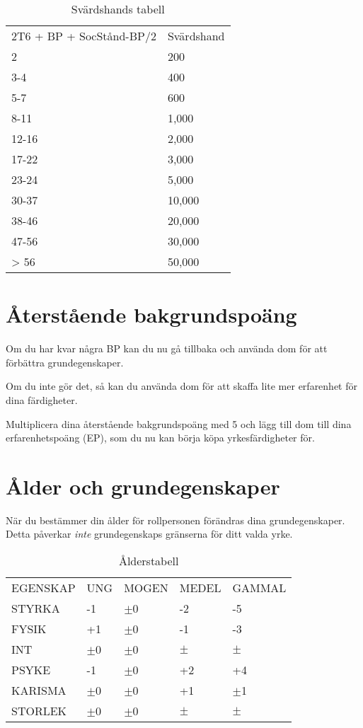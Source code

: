 \documentclass[a4paper, 10pt, titlepage]{article}
\begin{document}
\begin{table}[hbp]
  \caption{Svärdshands tabell}
  \begin{tabular}{|l|l|}
    \hline
    2T6 + BP + SocStånd-BP/2 & Svärdshand \\
    2      & 200 \\
    3-4    & 400 \\
    5-7    & 600 \\
    8-11   & 1,000 \\
    12-16  & 2,000 \\
    17-22  & 3,000 \\
    23-24  & 5,000 \\
    30-37  & 10,000 \\
    38-46  & 20,000 \\
    47-56  & 30,000 \\
    > 56   & 50,000 \\
  \end{tabular}
\end{table}

\section{Återstående bakgrundspoäng}
Om du har kvar några BP kan du nu gå tillbaka och använda dom för att
förbättra grundegenskaper.

Om du inte gör det, så kan du använda dom för att skaffa lite mer erfarenhet
för dina färdigheter.

Multiplicera dina återstående bakgrundspoäng med 5 och lägg till dom till dina
erfarenhetspoäng (EP), som du nu kan börja köpa yrkesfärdigheter för.

\section{Ålder och grundegenskaper}

När du bestämmer din ålder för rollpersonen förändras dina grundegenskaper. Detta
påverkar \textit{inte}  grundegenskaps gränserna för ditt valda yrke.

\begin{table}[hbp]
  \caption{Ålderstabell}
  \begin{tabular}{|l|l|l|l|l|}
    \hline
    EGENSKAP & UNG    & MOGEN   & MEDEL & GAMMAL \\
    STYRKA   & -1     & $\pm$0  & -2    & -5     \\
    FYSIK    & +1     & $\pm$0  & -1    & -3     \\
    INT      & $\pm$0 & $\pm$0  & $\pm$ & $\pm$  \\
    PSYKE    & -1     & $\pm$0  & +2    & +4     \\
    KARISMA  & $\pm$0 & $\pm$0  & +1    & $\pm$1 \\
    STORLEK  & $\pm$0 & $\pm$0  & $\pm$ & $\pm$  \\
  \end{tabular}
\end{table}
\end{document}
